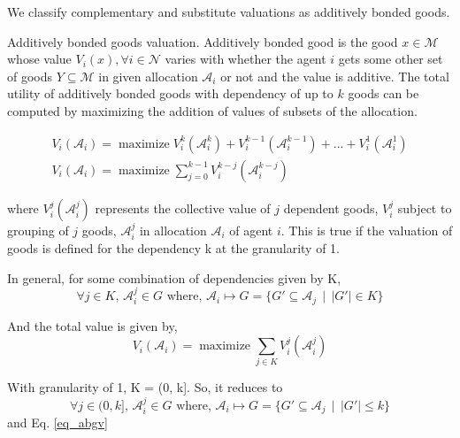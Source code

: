 We classify complementary and substitute valuations as additively bonded goods.

\begin{definition}{Additively bonded goods valuation.}
Additively bonded good is the good $x \in \mathcal{M}$ whose value $V_i(x), \forall i \in \mathcal{N}$ varies with whether the agent $i$ gets some other set of goods $Y \subseteq \mathcal{M}$ in given allocation $\mathcal{A}_i$ or not and the value is additive. The total utility of additively bonded goods with dependency of up to $k$ goods can be computed by maximizing the addition of values of subsets of the allocation.

\begin{equation}
\label{eq_abgv}
\begin{gathered}
    V_i(\mathcal{A}_i) = \operatorname{maximize} V^k_i(\mathcal{A}^k_i) + V^{k-1}_i(\mathcal{A}^{k-1}_i) + ... + V^1_i(\mathcal{A}^{1}_i) \\
    V_i(\mathcal{A}_i) = \operatorname{maximize} \sum_{j=0}^{k-1} V^{k-j}_i(\mathcal{A}^{k-j}_i)
\end{gathered}
\end{equation}

where $V^j_i(\mathcal{A}_i^{j})$ represents the collective value of $j$ dependent goods, $V^j_i$ subject to grouping of $j$ goods, $\mathcal{A}_i^j$ in allocation $\mathcal{A}_i$ of agent $i$. This is true if the valuation of goods is defined for the dependency k at the granularity of 1.

In general, for some combination of dependencies given by K,
$$
\forall j \in K \text{, } \mathcal{A}_i^{j} \in G \text{ where, } \mathcal{A}_i \mapsto G = \{G' \subseteq \mathcal{A}_j \, \mid \, \lvert G'\rvert \in K\}
$$

And the total value is given by,
$$
    V_i(\mathcal{A}_i) = \operatorname{maximize} \sum_{j \in K} V_i^j(\mathcal{A}_i^j)
$$

With granularity of 1, K = (0, k]. So, it reduces to
$$
\forall j \in (0, k] \text{, } \mathcal{A}_i^{j} \in G \text{ where, } \mathcal{A}_i \mapsto G = \{G' \subseteq \mathcal{A}_j \, \mid \, \lvert G'\rvert \leq k\}
$$
and Eq. \ref{eq_abgv}

\end{definition}

